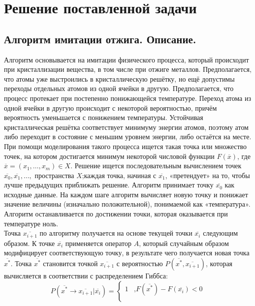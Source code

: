 \documentclass[14pt,a4paper]{scrartcl}
\begin{document}
	\section{Решение поставленной задачи}
	\subsection{Алгоритм имитации отжига. Описание.}
	\begin{flushleft}
	Алгоритм основывается на имитации физического процесса, который происходит при кристаллизации вещества, в том числе при отжиге металлов. Предполагается, что атомы уже выстроились в кристаллическую решётку, но ещё допустимы переходы отдельных атомов из одной ячейки в другую. Предполагается, что процесс протекает при постепенно понижающейся температуре. Переход атома из одной ячейки в другую происходит с некоторой вероятностью, причём вероятность уменьшается с понижением температуры. Устойчивая кристаллическая решётка соответствует минимуму энергии атомов, поэтому атом либо переходит в состояние с меньшим уровнем энергии, либо остаётся на месте.
	\\
	При помощи моделирования такого процесса ищется такая точка или множество точек, на котором достигается минимум некоторой числовой функции $F(\overline{x})$, где $\overline{x} = (x_1, \ldots, x_m) \in X$. Решение ищется последовательным вычислением точек $\overline{x_0}, \overline{x_1}, \ldots,$ пространства $X$;каждая точка, начиная с $\overline{x_1}$, «претендует» на то, чтобы лучше предыдущих приближать решение. Алгоритм принимает точку $\overline{x_0}$ как исходные данные. На каждом шаге алгоритм вычисляет новую точку и понижает значение величины (изначально положительной), понимаемой как «температура». Алгоритм останавливается по достижении точки, которая оказывается при температуре ноль.
	\\
	Точка $\overline{x_{i+1}}$ по алгоритму получается на основе текущей точки $\overline{x_{i}}$ следующим образом. К точке $\overline{x_{i}}$ применяется оператор $A$, который случайным образом модифицирует соответствующую точку, в результате чего получается новая точка $\overline{x^{*}}$. Точка $\overline{x^{*}}$ становится точкой $\overline{x_{i+1}}$ с вероятностью $P(\overline{x^{*}}, \overline{x_{i+1}})$, которая вычисляется в соответствии с распределением Гиббса:
		\begin{equation*}
			P(\overline{x^{*}} \rightarrow \overline{x_{i+1}} | \overline{x_{i}}) = 
				\begin{cases}
				1 &\text{,$F(\overline{x^{*}}) - F(\overline{x_{i}}) < 0$}\\

\end{cases}
\end{equation*}
\end{flushleft}
\end{document}
